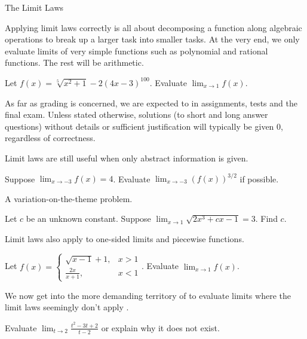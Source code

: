 \documentclass[../main.tex]{subfiles}
\begin{document}
\begin{lesson}{The Limit Laws}
  \clearpage

  Applying limit laws correctly is all about decomposing a function along algebraic operations to break up a larger task into smaller tasks. At the very end, we only evaluate limits of very simple functions such as polynomial and rational functions. The rest will be arithmetic.
  \begin{example}
    Let \(f(x) = \sqrt[5]{x^{2} + 1} - 2 (4x - 3)^{100}\). Evaluate \(\lim_{x \to 1} f(x)\).
  \end{example}
  \faExclamationTriangle{} As far as grading is concerned, we are expected to  in assignments, tests and the final exam.  Unless stated otherwise, solutions (to short and long answer questions) without details or sufficient justification will typically be given \(0\), regardless of correctness. 

  Limit laws are still useful when only abstract information is given.
  \begin{example}
    Suppose \(\lim_{x \to -3} f(x) = 4\). Evaluate \(\lim_{x \to -3} \left( f(x) \right)^{3/2}\) if possible.
  \end{example}

  A variation-on-the-theme problem.  
  \begin{example}
    Let \(c\) be an unknown constant. Suppose \(\lim_{x \to 1} \sqrt{2x^{3} + cx - 1} = 3\). Find \(c\).
  \end{example}

  \faLightbulb{} Limit laws also apply to one-sided limits and piecewise functions.
  \begin{example}
    Let \(f(x) = \begin{cases}\sqrt{x - 1} + 1, &x > 1\\[1ex]\frac{2x}{x + 1}, &x < 1\end{cases}\). Evaluate \(\lim_{x \to 1} f(x)\).
  \end{example}
  \clearpage

  We now get into the more demanding territory of  to evaluate limits where the limit laws seemingly don't apply .

  \begin{example} \label{ex:limit-cancellation}
    Evaluate \(\lim_{t \to 2} \frac{t^{2} - 3t + 2}{t - 2}\) or explain why it does not exist.
  \end{example}


\end{lesson}
\end{document}
